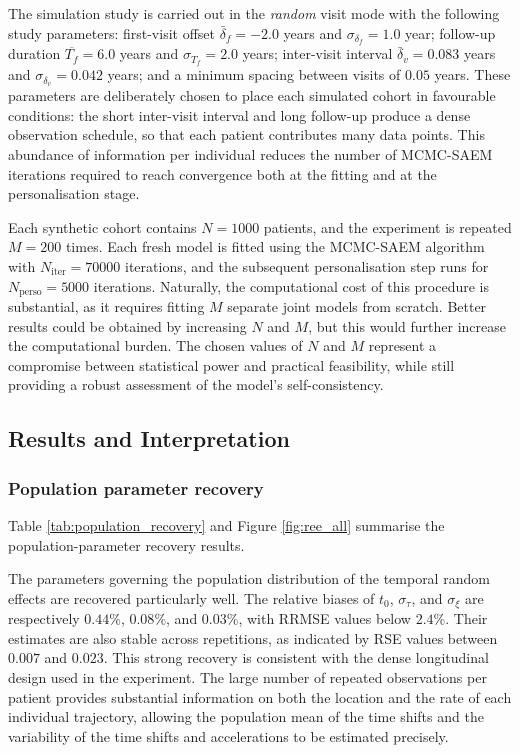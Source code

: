 \documentclass{rapportCS}
\begin{document}
The simulation study is carried out in the \textit{random} visit mode with the following study parameters: first-visit offset $\bar{\delta}_f = -2.0$ years and $\sigma_{\delta_f} = 1.0$ year; follow-up duration $\overline{T_f} = 6.0$ years and $\sigma_{T_f} = 2.0$ years; inter-visit interval $\bar{\delta}_v = 0.083$ years and $\sigma_{\delta_v} = 0.042$ years; and a minimum spacing between visits of $0.05$ years. These parameters are deliberately chosen to place each simulated cohort in favourable conditions: the short inter-visit interval and long follow-up produce a dense observation schedule, so that each patient contributes many data points. This abundance of information per individual reduces the number of MCMC-SAEM iterations required to reach convergence both at the fitting and at the personalisation stage.  

Each synthetic cohort contains $N = 1000$ patients, and the experiment is repeated $M = 200$ times. Each fresh model is fitted using the MCMC-SAEM algorithm with $N_{\mathrm{iter}} = 70000$ iterations, and the subsequent personalisation step runs for $N_{\mathrm{perso}} = 5000$ iterations. Naturally, the computational cost of this procedure is substantial, as it requires fitting $M$ separate joint models from scratch. Better results could be obtained by increasing $N$ and $M$, but this would further increase the computational burden. The chosen values of $N$ and $M$ represent a compromise between statistical power and practical feasibility, while still providing a robust assessment of the model's self-consistency.

\subsection{Results and Interpretation}
\subsubsection{Population parameter recovery}

Table \ref{tab:population_recovery} and Figure \ref{fig:ree_all} summarise the population-parameter recovery results. 

The parameters governing the population distribution of the temporal random effects are recovered particularly well. The relative biases of $t_0$, $\sigma_\tau$, and $\sigma_\xi$ are respectively $0.44\%$, $0.08\%$, and $0.03\%$, with RRMSE values below $2.4\%$. Their estimates are also stable across repetitions, as indicated by RSE values between $0.007$ and $0.023$. This strong recovery is consistent with the dense longitudinal design used in the experiment. The large number of repeated observations per patient provides substantial information on both the location and the rate of each individual trajectory, allowing the population mean of the time shifts and the variability of the time shifts and accelerations to be estimated precisely.
\end{document}
